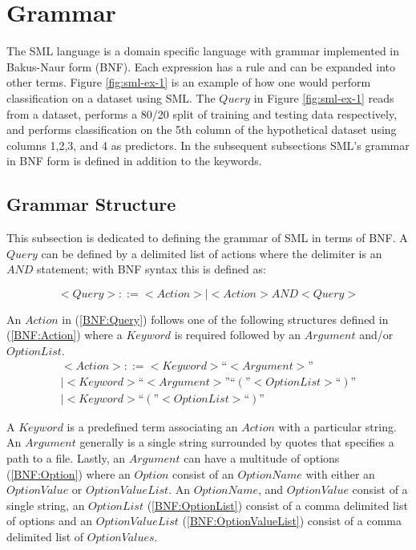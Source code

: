 \documentclass[jair,twoside,11pt,theapa]{article}
\begin{document}
\section{Grammar}
\label{grammar}

The SML language is a domain specific language with grammar implemented in Bakus-Naur form (BNF). Each expression has a rule and can be expanded into other terms. Figure \ref{fig:sml-ex-1} is an example of how one would perform classification on a dataset using SML. The \(Query\) in Figure \ref{fig:sml-ex-1} reads from a dataset, performs a 80/20 split of training and testing data respectively, and performs classification on the 5th column of the hypothetical dataset using columns 1,2,3, and 4 as predictors. In the subsequent subsections SML's grammar in BNF form is defined in addition to the keywords.

\subsection{Grammar Structure}
This subsection is dedicated to defining the grammar of SML in terms of BNF. A \(Query\) can be defined by a delimited list of actions where the delimiter is an \(AND\) statement; with BNF syntax this is defined as:

\begin{equation} \label{BNF:Query}
<Query> ::= <Action> | <Action> AND <Query>
\end{equation}

An \(Action\) in (\ref{BNF:Query}) follows one of the following structures defined in (\ref{BNF:Action}) where a \(Keyword\) is required followed by an \(Argument\) and/or \(OptionList\).
\begin{equation} \label{BNF:Action}
\begin{split}
<Action> ::= <Keyword> “<Argument>” \\
| <Keyword> “<Argument>” “(”<Option List>“)” \\
| <Keyword> “(”<Option List>“)”
\end{split}
\end{equation}

A \(Keyword\) is a predefined term associating an \(Action\) with a particular string. An \(Argument\) generally is a single string surrounded by quotes that specifies a path to a file. Lastly, an \(Argument\) can have a multitude of options (\ref{BNF:Option}) where an \(Option\) consist of an \(OptionName\) with either an \(OptionValue\) or \(OptionValueList\). An \(OptionName\), and \(OptionValue\) consist of a single string, an \(OptionList\) (\ref{BNF:OptionList}) consist of a comma delimited list of options and an \(OptionValueList\) (\ref{BNF:OptionValueList}) consist of a comma delimited list of \(OptionValues\).
\end{document}

